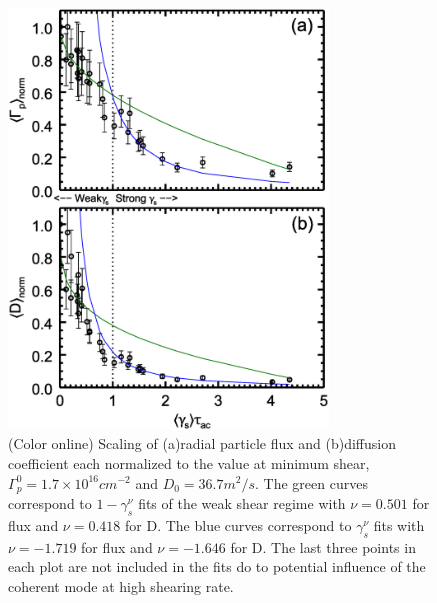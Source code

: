 \documentclass[aip,pop,amsmath,amssymb,peprint,superscriptaddress]{revtex4-1} %
\begin{document}
\begin{figure}[!htbp]
\centerline{
\includegraphics[width=8.5cm]{figure3.eps}}
\caption{\label{fig:fluxandD} (Color online) Scaling of (a)radial particle flux and (b)diffusion coefficient each normalized to the value at minimum shear, $\Gamma_{p}^{0} = 1.7\times10^{16} cm^{-2}$ and $D_{0} = 36.7 m^{2}/s$. The green curves correspond to $1-\gamma_{s}^{\nu}$ fits of the weak shear regime with $\nu = 0.501$ for flux and $\nu = 0.418$ for D. The blue curves correspond to $\gamma_{s}^{\nu}$ fits with $\nu = -1.719$ for flux and $\nu = -1.646$ for D. The last three points in each plot are not included in the fits do to potential influence of the coherent mode at high shearing rate.}
\end{figure}
\end{document}
